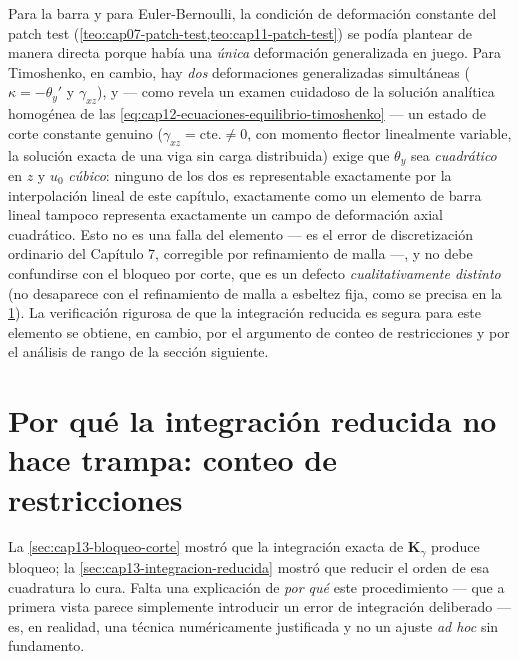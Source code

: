 \begin{observacion}
Para la barra y para Euler-Bernoulli, la condición de deformación constante del patch test (\cref{teo:cap07-patch-test,teo:cap11-patch-test}) se podía plantear de manera directa porque había una \emph{única} deformación generalizada en juego. Para Timoshenko, en cambio, hay \emph{dos} deformaciones generalizadas simultáneas ($\kappa=-\theta_y'$ y $\gamma_{xz}$), y --- como revela un examen cuidadoso de la solución analítica homogénea de las \cref{eq:cap12-ecuaciones-equilibrio-timoshenko} --- un estado de corte constante genuino ($\gamma_{xz}=\text{cte.}\neq0$, con momento flector linealmente variable, la solución exacta de una viga sin carga distribuida) exige que $\theta_y$ sea \emph{cuadrático} en $z$ y $u_0$ \emph{cúbico}: ninguno de los dos es representable exactamente por la interpolación lineal de este capítulo, exactamente como un elemento de barra lineal tampoco representa exactamente un campo de deformación axial cuadrático. Esto no es una falla del elemento --- es el error de discretización ordinario del Capítulo 7, corregible por refinamiento de malla ---, y no debe confundirse con el bloqueo por corte, que es un defecto \emph{cualitativamente distinto} (no desaparece con el refinamiento de malla a esbeltez fija, como se precisa en la \cref{sec:cap14-conteo-restricciones}). La verificación rigurosa de que la integración reducida es segura para este elemento se obtiene, en cambio, por el argumento de conteo de restricciones y por el análisis de rango de la sección siguiente.
\end{observacion}

\section{Por qué la integración reducida no hace trampa: conteo de restricciones}
\label{sec:cap14-conteo-restricciones}

La \cref{sec:cap13-bloqueo-corte} mostró que la integración exacta de $\bm K_\gamma$ produce bloqueo; la \cref{sec:cap13-integracion-reducida} mostró que reducir el orden de esa cuadratura lo cura. Falta una explicación de \emph{por qué} este procedimiento --- que a primera vista parece simplemente introducir un error de integración deliberado --- es, en realidad, una técnica numéricamente justificada y no un ajuste \emph{ad hoc} sin fundamento.

